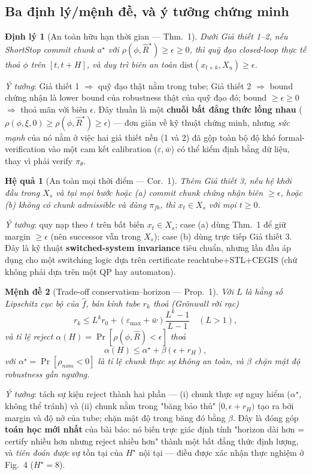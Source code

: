 \documentclass[a4paper,12pt]{article}
\newtheorem{theorem}{{\bf Định lý}}
\newtheorem{proposition}{{\bf Mệnh đề}}
\newtheorem{corollary}[proposition]{{\bf Hệ quả}}
\begin{document}
\subsection{Ba định lý/mệnh đề, và ý tưởng chứng minh}
\begin{theorem}[An toàn hữu hạn thời gian --- Thm.~1]
Dưới Giả thiết 1--2, nếu ShortStop commit chunk $a^\star$ với $\rho(\phi,\hat R^\star)\ge\epsilon\ge 0$, thì quỹ đạo closed-loop thực tế thoả $\phi$ trên $[t,t+H]$, và duy trì biên an toàn $\mathrm{dist}(x_{t+k},X_u)\ge\epsilon$.
\end{theorem}
\emph{Ý tưởng}: Giả thiết 1 $\Rightarrow$ quỹ đạo thật nằm trong tube; Giả thiết 2 $\Rightarrow$ bound chứng nhận là lower bound của robustness thật của quỹ đạo đó; bound $\ge\epsilon\ge 0$ $\Rightarrow$ thoả mãn với biên $\epsilon$. Đây thuần là một \textbf{chuỗi bất đẳng thức lồng nhau} ($\rho(\phi,\xi,0)\ge\rho(\phi,\hat R^\star)\ge\epsilon$) --- đơn giản về kỹ thuật chứng minh, nhưng \emph{sức mạnh} của nó nằm ở việc hai giả thiết nền (1 và 2) đã gộp toàn bộ độ khó formal-verification vào một cam kết calibration ($\varepsilon,\bar w$) có thể kiểm định bằng dữ liệu, thay vì phải verify $\pi_\theta$.

\begin{corollary}[An toàn mọi thời điểm --- Cor.~1]
Thêm Giả thiết 3, nếu hệ khởi đầu trong $X_s$ và tại mọi bước hoặc (a) commit chunk chứng nhận biên $\ge\epsilon$, hoặc (b) không có chunk admissible và dùng $\pi_{fb}$, thì $x_t\in X_s$ với mọi $t\ge 0$.
\end{corollary}
\emph{Ý tưởng}: quy nạp theo $t$ trên bất biến $x_t\in X_s$; case (a) dùng Thm.~1 để giữ margin $\ge\epsilon$ (nên successor vẫn trong $X_s$); case (b) dùng trực tiếp Giả thiết 3. Đây là kỹ thuật \textbf{switched-system invariance} tiêu chuẩn, nhưng lần đầu áp dụng cho một switching logic dựa trên certificate reachtube+STL+CEGIS (chứ không phải dựa trên một QP hay automaton).

\begin{proposition}[Trade-off conservatism--horizon --- Prop.~1]
Với $L$ là hằng số Lipschitz cục bộ của $\hat f$, bán kính tube $r_k$ thoả (Grönwall rời rạc)
\[
r_k \le L^k r_0 + (\varepsilon_{\max}+\bar w)\frac{L^k-1}{L-1}\quad (L>1),
\]
và tỉ lệ reject $\alpha(H)=\Pr[\rho(\phi,\hat R)<\epsilon]$ thoả
\[
\alpha(H) \le \alpha^\star + \beta(\epsilon+r_H),
\]
với $\alpha^\star=\Pr[\rho_{nom}<0]$ là tỉ lệ chunk \emph{thực sự} không an toàn, và $\beta$ chặn mật độ robustness gần ngưỡng.
\end{proposition}
\emph{Ý tưởng}: tách sự kiện reject thành hai phần --- (i) chunk thực sự nguy hiểm ($\alpha^\star$, không thể tránh) và (ii) chunk nằm trong "băng bảo thủ" $[0,\epsilon+r_H)$ tạo ra bởi margin và độ nở của tube; chặn mật độ trong băng đó bằng $\beta$. Đây là đóng góp \textbf{toán học mới nhất} của bài báo: nó biến trực giác định tính "horizon dài hơn = certify nhiều hơn nhưng reject nhiều hơn" thành một bất đẳng thức định lượng, và \emph{tiên đoán được} sự tồn tại của $H^\star$ nội tại --- điều được xác nhận thực nghiệm ở Fig.~4 ($H^\star=8$).
\end{document}
